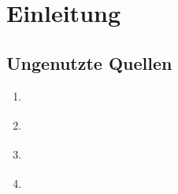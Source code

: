 \chapter{Einleitung}



\section*{Ungenutzte Quellen}
\begin{enumerate}
	\item \cite{BASISWISSEN_SOFTWAETEST}
	\item \cite[20ff]{DER_INTEGRATIONSTEST}
	\item \cite{MODELLGETRIEBENE_SOFTWAREENTWICKLUNG}
	\item \cite{DOMAIN_DRIVEN_DESIGN}
\end{enumerate}

